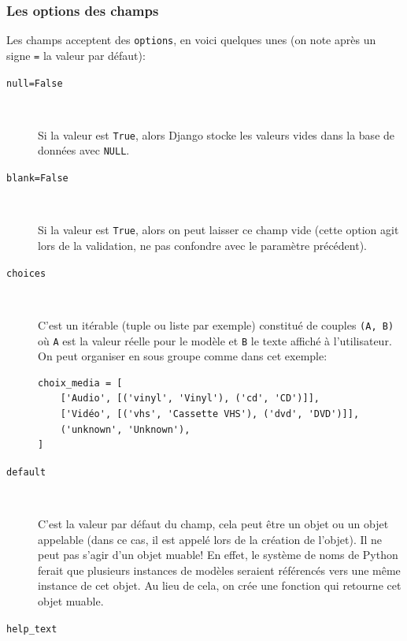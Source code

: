 \documentclass[a4paper, 10pt]{article}
\begin{document}
\subsubsection{Les options des champs}
Les champs acceptent des \texttt{options}, en voici quelques unes (on note après un signe \texttt{=} la valeur par défaut):
\begin{description}
    \item[\texttt{null=False}]~

          Si la valeur est \texttt{True}, alors Django stocke les valeurs vides dans la base de données avec \texttt{NULL}.

    \item[\texttt{blank=False}]~

          Si la valeur est \texttt{True}, alors on peut laisser ce champ vide (cette option agit lors de la validation, ne pas confondre avec le paramètre précédent).

    \item[\texttt{choices}]~

          C'est un itérable (tuple ou liste par exemple) constitué de couples \texttt{(A, B)} où \texttt{A} est la valeur réelle pour le modèle et \texttt{B} le texte affiché à l'utilisateur. On peut organiser en sous groupe comme dans cet exemple:

          \begin{verbatim}
choix_media = [
    ['Audio', [('vinyl', 'Vinyl'), ('cd', 'CD')]],
    ['Vidéo', [('vhs', 'Cassette VHS'), ('dvd', 'DVD')]],
    ('unknown', 'Unknown'),
]
    \end{verbatim}

    \item[\texttt{default}]~

          C'est la valeur par défaut du champ, cela peut être un objet ou un objet appelable (dans ce cas, il est appelé lors de la création de l'objet). Il ne peut pas s'agir d'un objet muable! En effet, le système de noms de Python ferait que plusieurs instances de modèles seraient référencés vers une même instance de cet objet. Au lieu de cela, on crée une fonction qui retourne cet objet muable.

    \item[\texttt{help_text}]~


\end{description}
\end{document}
